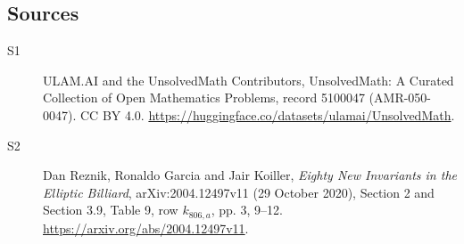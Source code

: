 \documentclass[11pt]{article}
\begin{document}
\subsection{Sources}
\begin{description}
\item[\hypertarget{source:5100047:1}{S1}] ULAM.AI and the UnsolvedMath Contributors, UnsolvedMath: A Curated Collection of Open Mathematics Problems, record 5100047 (AMR-050-0047). CC BY 4.0. \url{https://huggingface.co/datasets/ulamai/UnsolvedMath}.
\item[\hypertarget{source:5100047:2}{S2}] Dan Reznik, Ronaldo Garcia and Jair Koiller, \emph{Eighty New Invariants in the Elliptic Billiard}, arXiv:2004.12497v11 (29 October 2020), Section 2 and Section 3.9, Table 9, row $k_{806,a}$, pp. 3, 9--12. \url{https://arxiv.org/abs/2004.12497v11}.
\end{description}
\label{end:5100047}
\end{document}
